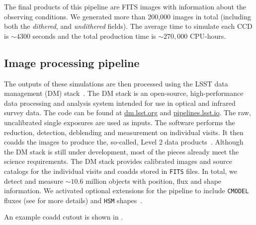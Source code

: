\documentclass[twocolumn]{aastex62}
\begin{document}
The final products of this pipeline are FITS images with information about the observing conditions. We generated more than 200,000 images in total (including both the \textit{dithered}, and \textit{undithered} fields). The average time to simulate each CCD is $\sim 4300$ seconds and the total production time is $\sim 270,000$ CPU-hours.



\subsection{Image processing pipeline}
\label{sec:image_processing_pipeline}

The outputs of these simulations are then processed using the LSST data management (DM) stack~\citep{Overview,ScienceBook,WhitePaper,2017arXiv170506766B,2015arXiv151207914J}. The DM stack is an open-source, high-performance data processing and analysis system intended for use in optical and infrared survey data. The code can be found at \url{dm.lsst.org} and \url{pipelines.lsst.io}. The raw, uncalibrated single exposures are used as inputs. The software performs the reduction, detection, deblending and measurement on individual visits. It then coadds the images to produce the, so-called, Level 2 data products~\citep{2015arXiv151207914J}. Although the DM stack is still under development, most of the pieces already meet the science requirements. The DM stack provides calibrated images and source catalogs for the individual visits and coadds stored in \texttt{FITS} files. In total, we detect and measure $\sim 10.6$ million objects with position, flux and shape information. We activated optional extensions for the pipeline to include \texttt{CMODEL} fluxes (see \cite{2017arXiv170506766B} for more details) and \texttt{HSM} shapes~\citep{2003MNRAS.343..459H,2005MNRAS.361.1287M}.

An example coadd cutout is shown in .
\end{document}
